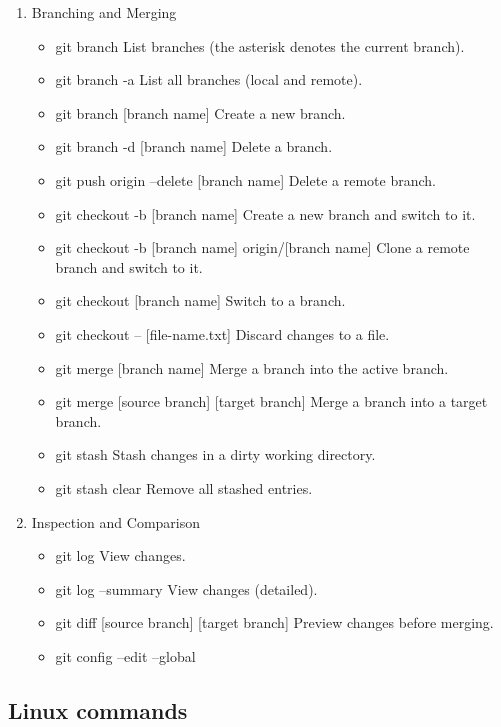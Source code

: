 \documentclass[12pt]{article}
\begin{document}
\begin{enumerate}
\item Branching and Merging
\begin{itemize} [label=\textbullet, font=\small \color{blue}]
\item git branch \tabto{8cm} List branches (the asterisk denotes the current branch).
\item git branch -a \tabto{8cm} List all branches (local and remote).
\item git branch [branch name] \tabto{8cm} Create a new branch.
\item git branch -d [branch name] \tabto{8cm} Delete a branch.
\item git push origin --delete [branch name] \tabto{8cm} Delete a remote branch.
\item git checkout -b [branch name] \tabto{8cm} Create a new branch and switch to it.
\item git checkout -b [branch name] origin/[branch name] \tabto{8cm} Clone a remote branch and switch to it.
\item git checkout [branch name] \tabto{8cm} 	Switch to a branch.
\item git checkout -- [file-name.txt] \tabto{8cm} Discard changes to a file.
\item git merge [branch name] \tabto{8cm} Merge a branch into the active branch.
\item git merge [source branch] [target branch] \tabto{8cm} Merge a branch into a target branch.
\item git stash \tabto{8cm} Stash changes in a dirty working directory.
\item git stash clear \tabto{8cm} Remove all stashed entries.
\end{itemize}

\item Inspection and Comparison
\begin{itemize} [label=\textbullet, font=\small \color{blue}]
\item git log \tabto{8cm} View changes.
\item git log --summary \tabto{8cm} View changes (detailed).
\item git diff [source branch] [target branch] \tabto{8cm} Preview changes before merging.
\item git config --edit --global \tabto{8cm} 
\end{itemize}
\end{enumerate}

\subsection{Linux commands}
\end{document}
